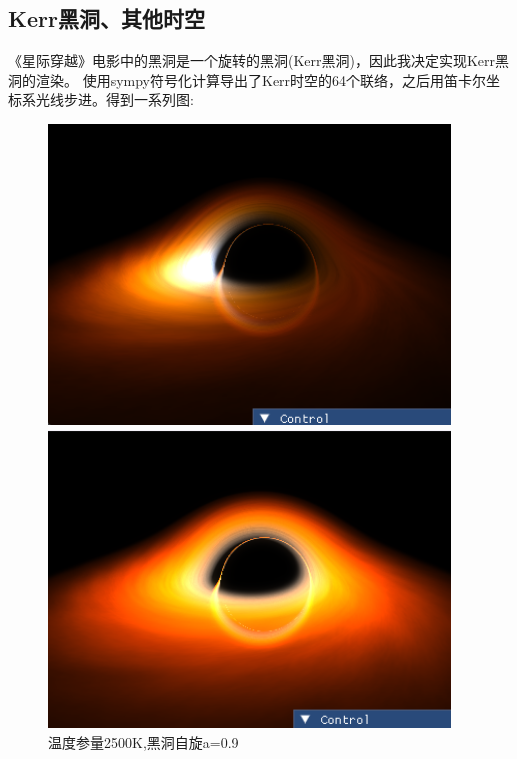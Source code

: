 \documentclass[a4paper, 12pt]{article}
\begin{document}
    \subsection{Kerr黑洞、其他时空}
    《星际穿越》电影中的黑洞是一个旋转的黑洞(Kerr黑洞)，因此我决定实现Kerr黑洞的渲染。
    使用sympy符号化计算导出了Kerr时空的64个联络，之后用笛卡尔坐标系光线步进。得到一系列图:
    \begin{figure}[H]
        \centering
        \begin{minipage}[t]{0.48\textwidth}
            \centering
            \includegraphics[width=0.95\textwidth]{photo/2k5T.png}
            \caption{温度参量2500K,黑洞自旋a=0.9}
        \end{minipage}
        \hfill
        \begin{minipage}[t]{0.48\textwidth}
            \centering
            \includegraphics[width=0.95\textwidth]{photo/2k5T_ND.png}

\end{minipage}
\end{figure}
\end{document}
